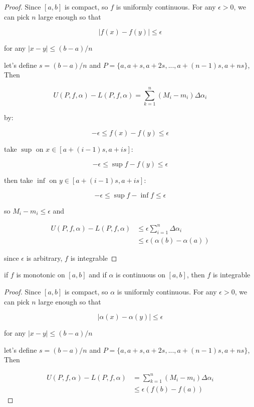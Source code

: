 \begin{proof}
    Since $[a,b]$ is compact, so $f$ is uniformly continuous. For any $\epsilon >0$, we can pick $n$ large enough so that

    \[
        \left| f(x) - f(y) \right| \le \epsilon
    \]

    for any $\left| x-y\right| \le (b-a)/n$
    
    let's define $s = (b-a)/n$ and $P = \{a,a+s, a+2s, ..., a+(n-1)s, a+ns\}$, Then

    \[
        U(P,f,\alpha) - L(P,f,\alpha) = \sum_{k=1}^{n}\left(M_i - m_i \right) \Delta \alpha_i
    \]

    by:

    \[
        -\epsilon \le f(x) -f(y) \le \epsilon
    \]

    take $\sup$ on $x \in [a+(i-1)s, a+is]$:


    \[
        -\epsilon \le \sup f -f(y) \le \epsilon
    \]

    then take $\inf$ on $y \in [a+(i-1)s, a + is]$:


    \[
        -\epsilon \le \sup f - \inf f \le \epsilon
    \]

    so $M_i - m_i \le \epsilon$ and


    \begin{align*}
        U(P,f,\alpha) - L(P,f,\alpha) &\le \epsilon \sum_{i=1}^{n} \Delta \alpha_i \\
        & \le \epsilon (\alpha(b) - \alpha(a))
    \end{align*}

    since $\epsilon$ is arbitrary, $f$ is integrable
\end{proof}

\begin{thm}
    if $f$ is monotonic on $[a,b]$ and if $\alpha$ is continuous on $[a,b]$, then
    $f$ is integrable
\end{thm}

\begin{proof}
    Since $[a,b]$ is compact, so $\alpha$ is uniformly continuous. For any $\epsilon >0$, we can pick $n$ large enough so that

    \[
        \left| \alpha(x) - \alpha(y) \right| \le \epsilon
    \]

    for any $\left| x-y\right| \le (b-a)/n$

    let's define $s = (b-a)/n$ and $P = \{a,a+s, a+2s, ..., a+(n-1)s, a+ns\}$, Then


    \begin{align*}
        U(P,f,\alpha) - L(P,f,\alpha) &= \sum_{k=1}^{n}\left(M_i - m_i \right) \Delta \alpha_i \\
        & \le \epsilon \left( f(b) - f(a) \right)
    \end{align*}
\end{proof}

